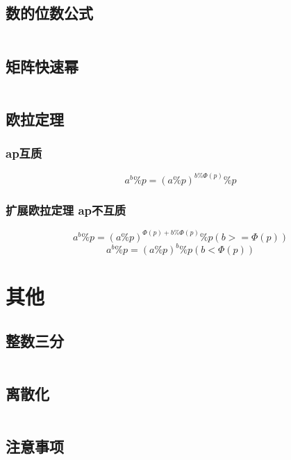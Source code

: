\documentclass[a4paper,11pt]{article}
\begin{document}
\subsection{数的位数公式} %
\inputminted[breaklines]{c++}{数论/数的位数公式.cpp} %

\subsection{矩阵快速幂} %
\inputminted[breaklines]{c++}{数论/矩阵快速幂.cpp} %

\subsection{欧拉定理} %
\subsubsection{ap互质} %
\begin{equation}
a ^ b \% p = (a \% p) ^ {b \% \Phi(p)}  \% p
\end{equation}
\subsubsection{扩展欧拉定理 ap不互质} %
\begin{equation}
a ^ b \% p = (a \% p ) ^ {\Phi(p) + b \% \Phi(p)} \% p (b >= \Phi(p))
\end{equation}
\begin{equation}
a ^ b \% p = (a \% p ) ^ b \% p (b < \Phi(p))
\end{equation}


\section{其他} %
\subsection{整数三分} %
\inputminted[breaklines]{c++}{其他/整数三分.cpp} %

\subsection{离散化} %
\inputminted[breaklines]{c++}{其他/离散化.cpp}

\subsection{注意事项} %

\end{document}

